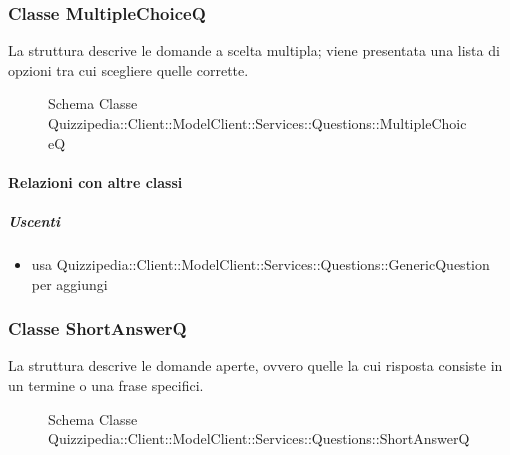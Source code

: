 \subsubsection{Classe MultipleChoiceQ}
La struttura descrive le domande a scelta multipla; viene presentata una lista di opzioni tra cui scegliere quelle corrette.
\begin{figure}[H]
\centering
\noindent{}
\caption[Schema Classe MultipleChoiceQ]{Schema Classe Quizzipedia::Client::ModelClient::Services::Questions::MultipleChoiceQ}
\end{figure}
\paragraph{Relazioni con altre classi}
\subparagraph{Uscenti}
\begin{itemize}
\item usa Quizzipedia::Client::ModelClient::Services::Questions::GenericQuestion per aggiungi
\end{itemize}
\subsubsection{Classe ShortAnswerQ}
La struttura descrive le domande aperte, ovvero quelle la cui risposta consiste in un termine o una frase specifici.
\begin{figure}[H]
\centering
\noindent{}
\caption[Schema Classe ShortAnswerQ]{Schema Classe Quizzipedia::Client::ModelClient::Services::Questions::ShortAnswerQ}
\end{figure}
